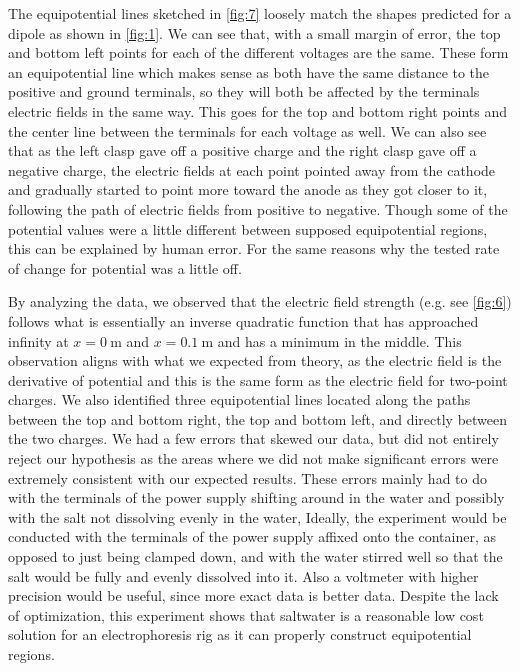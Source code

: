 ﻿\documentclass[10pt,journal,twoside]{IEEEtran}
\begin{document}
The equipotential lines sketched in \cref{fig:7} loosely match the shapes predicted for a dipole as shown in \cref{fig:1}. We can see that, with a small margin of error, the top and bottom left points for each of the different voltages are the same. These form an equipotential line which makes sense as both have the same distance to the positive and ground terminals, so they will both be affected by the terminals electric fields in the same way. This goes for the top and bottom right points and the center line between the terminals for each voltage as well. We can also see that as the left clasp gave off a positive charge and the right clasp gave off a negative charge, the electric fields at each point pointed away from the cathode and gradually started to point more toward the anode as they got closer to it, following the path of electric fields from positive to negative. Though some of the potential values were a little different between supposed equipotential regions, this can be explained by human error. For the same reasons why the tested rate of change for potential was a little off.


By analyzing the data, we observed that the electric field strength (e.g. see \cref{fig:6}) follows what is essentially an inverse quadratic function that has approached infinity at $x=\qty{0}{\meter}$ and $x=\qty{0.1}{\meter}$ and has a minimum in the middle. This observation aligns with what we expected from theory, as the electric field is the derivative of potential and this is the same form as the electric field for two-point charges. We also identified three equipotential lines located along the paths between the top and bottom right, the top and bottom left, and directly between the two charges. We had a few errors that skewed our data, but did not entirely reject our hypothesis as the areas where we did not make significant errors were extremely consistent with our expected results. These errors mainly had to do with the terminals of the power supply shifting around in the water and possibly with the salt not dissolving evenly in the water, Ideally, the experiment would be conducted with the terminals of the power supply affixed onto the container, as opposed to just being clamped down, and with the water stirred well so that the salt would be fully and evenly dissolved into it. Also a voltmeter with higher precision would be useful, since more exact data is better data. Despite the lack of optimization, this experiment shows that saltwater is a reasonable low cost solution for an electrophoresis rig as it can properly construct equipotential regions.
\end{document}
